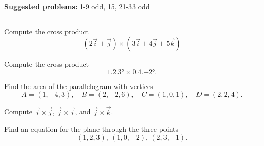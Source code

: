 \documentclass[12pt,reqno]{amsart}
\begin{document}
\textbf{Suggested problems:} 1-9 odd, 15, 21-33 odd

\bigskip
\hrule

\bigskip

\prob Compute the cross product
	\[(2\vec{i}+\vec{j}) \times (3\vec{i}+4\vec{j}+5\vec{k})
	\]

\vfill
\prob Compute the cross product
	\[\ang{1,2,3} \times \ang{0,4,-2}.
	\]
	
\vfill
\prob Find the area of the parallelogram with vertices
	\[A = (1,-4,3), \quad B=(2,-2,6), \quad C=(1,0,1), \quad D= ( 2,2,4).
	\]

\vfill
\newpage
\prob Compute $\vec{i} \times \vec{j}$, $\vec{j} \times \vec{i}$, and $\vec{j} \times \vec{k}$.

\vfill
\prob Find an equation for the plane through the three points
	\[(1,2,3), \ (1,0,-2), \ (2,3,-1).
	\]
\vfill
\end{document}
